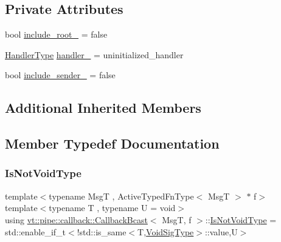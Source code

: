 \subsection*{Private Attributes}
\begin{DoxyCompactItemize}
\item 
bool \hyperlink{structvt_1_1pipe_1_1callback_1_1_callback_bcast_aa8131509ae6250ba45fd2200ff796661}{include\+\_\+root\+\_\+} = false
\item 
\hyperlink{namespacevt_af64846b57dfcaf104da3ef6967917573}{Handler\+Type} \hyperlink{structvt_1_1pipe_1_1callback_1_1_callback_bcast_a3ea3dbcdb923e07ef664094954313eb1}{handler\+\_\+} = uninitialized\+\_\+handler
\item 
bool \hyperlink{structvt_1_1pipe_1_1callback_1_1_callback_bcast_a143859ea6a28eec100d0e2b19d13b004}{include\+\_\+sender\+\_\+} = false
\end{DoxyCompactItemize}
\subsection*{Additional Inherited Members}


\subsection{Member Typedef Documentation}
\mbox{\label{structvt_1_1pipe_1_1callback_1_1_callback_bcast_a3f5efa2edf7f4c47fe047e086e63a477}} 
\subsubsection{\texorpdfstring{Is\+Not\+Void\+Type}{IsNotVoidType}}
{\footnotesize\ttfamily template$<$typename MsgT , Active\+Typed\+Fn\+Type$<$ Msg\+T $>$ $\ast$ f$>$ \\
template$<$typename T , typename U  = void$>$ \\
using \hyperlink{structvt_1_1pipe_1_1callback_1_1_callback_bcast}{vt\+::pipe\+::callback\+::\+Callback\+Bcast}$<$ MsgT, f $>$\+::\hyperlink{structvt_1_1pipe_1_1callback_1_1_callback_bcast_a3f5efa2edf7f4c47fe047e086e63a477}{Is\+Not\+Void\+Type} =  std\+::enable\+\_\+if\+\_\+t$<$!std\+::is\+\_\+same$<$T,\hyperlink{structvt_1_1pipe_1_1callback_1_1_callback_bcast_a64032b57b71c27653b93b3e13bf38145}{Void\+Sig\+Type}$>$\+::value,U$>$}

